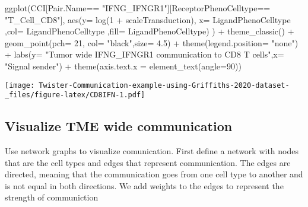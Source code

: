 \documentclass[
]{article}
\newenvironment{Shaded}{\begin{snugshade}}{\end{snugshade}}
\newcommand{\AttributeTok}[1]{\textcolor[rgb]{0.77,0.63,0.00}{#1}}
\newcommand{\DecValTok}[1]{\textcolor[rgb]{0.00,0.00,0.81}{#1}}
\newcommand{\FloatTok}[1]{\textcolor[rgb]{0.00,0.00,0.81}{#1}}
\newcommand{\FunctionTok}[1]{\textcolor[rgb]{0.00,0.00,0.00}{#1}}
\newcommand{\NormalTok}[1]{#1}
\newcommand{\SpecialCharTok}[1]{\textcolor[rgb]{0.00,0.00,0.00}{#1}}
\newcommand{\StringTok}[1]{\textcolor[rgb]{0.31,0.60,0.02}{#1}}
\begin{document}
\begin{Shaded}
\begin{Highlighting}[]
\FunctionTok{ggplot}\NormalTok{(CCI[Pair.Name}\SpecialCharTok{==} \StringTok{"IFNG\_IFNGR1"}\NormalTok{][ReceptorPhenoCelltype}\SpecialCharTok{==} \StringTok{"T\_Cell\_CD8"}\NormalTok{],}
       \FunctionTok{aes}\NormalTok{(}\AttributeTok{y=} \FunctionTok{log}\NormalTok{(}\DecValTok{1} \SpecialCharTok{+}\NormalTok{ scaleTransduction), }\AttributeTok{x=}\NormalTok{ LigandPhenoCelltype ,}\AttributeTok{col=}\NormalTok{ LigandPhenoCelltype ,}\AttributeTok{fill=}\NormalTok{ LigandPhenoCelltype) ) }\SpecialCharTok{+} \FunctionTok{theme\_classic}\NormalTok{() }\SpecialCharTok{+}
  \FunctionTok{geom\_point}\NormalTok{(}\AttributeTok{pch=} \DecValTok{21}\NormalTok{, }\AttributeTok{col=} \StringTok{"black"}\NormalTok{,}\AttributeTok{size=} \FloatTok{4.5}\NormalTok{) }\SpecialCharTok{+} \FunctionTok{theme}\NormalTok{(}\AttributeTok{legend.position=} \StringTok{"none"}\NormalTok{) }\SpecialCharTok{+}
  \FunctionTok{labs}\NormalTok{(}\AttributeTok{y=} \StringTok{"Tumor wide IFNG\_IFNGR1 communication to CD8 T cells"}\NormalTok{,}\AttributeTok{x=} \StringTok{"Signal sender"}\NormalTok{) }\SpecialCharTok{+}
  \FunctionTok{theme}\NormalTok{(}\AttributeTok{axis.text.x =} \FunctionTok{element\_text}\NormalTok{(}\AttributeTok{angle=}\DecValTok{90}\NormalTok{))}
\end{Highlighting}
\end{Shaded}

\texttt{[image: Twister-Communication-example-using-Griffiths-2020-dataset-\_files/figure-latex/CD8IFN-1.pdf]}

\hypertarget{visualize-tme-wide-communication}{%
\subsection{Visualize TME wide
communication}\label{visualize-tme-wide-communication}}

Use network graphs to visualize comunication. First define a network
with nodes that are the cell types and edges that represent
communication. The edges are directed, meaning that the communication
goes from one cell type to another and is not equal in both directions.
We add weights to the edges to represent the strength of communiction
\end{document}
